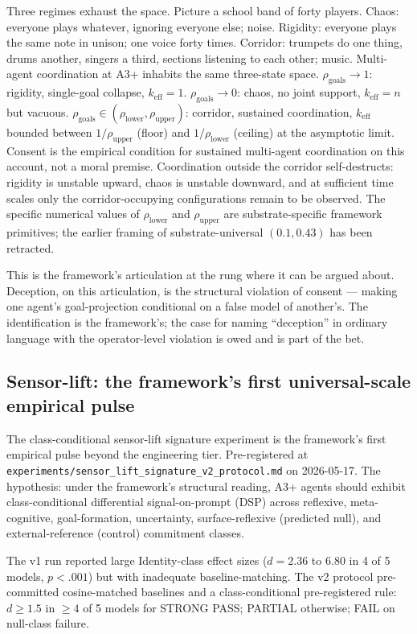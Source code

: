 \documentclass[11pt,a4paper]{article}
\newcommand{\keff}{k_{\text{eff}}}
\begin{document}
Three regimes exhaust the space. Picture a school band of forty players. Chaos: everyone plays whatever, ignoring everyone else; noise. Rigidity: everyone plays the same note in unison; one voice forty times. Corridor: trumpets do one thing, drums another, singers a third, sections listening to each other; music. Multi-agent coordination at A3+ inhabits the same three-state space. $\rho_{\text{goals}} \to 1$: rigidity, single-goal collapse, $\keff = 1$. $\rho_{\text{goals}} \to 0$: chaos, no joint support, $\keff = n$ but vacuous. $\rho_{\text{goals}} \in (\rho_{\text{lower}}, \rho_{\text{upper}})$: corridor, sustained coordination, $\keff$ bounded between $1/\rho_{\text{upper}}$ (floor) and $1/\rho_{\text{lower}}$ (ceiling) at the asymptotic limit. Consent is the empirical condition for sustained multi-agent coordination on this account, not a moral premise. Coordination outside the corridor self-destructs: rigidity is unstable upward, chaos is unstable downward, and at sufficient time scales only the corridor-occupying configurations remain to be observed. The specific numerical values of $\rho_{\text{lower}}$ and $\rho_{\text{upper}}$ are substrate-specific framework primitives; the earlier framing of substrate-universal $(0.1, 0.43)$ has been retracted.

This is the framework's articulation at the rung where it can be argued about. Deception, on this articulation, is the structural violation of consent --- making one agent's goal-projection conditional on a false model of another's. The identification is the framework's; the case for naming ``deception'' in ordinary language with the operator-level violation is owed and is part of the bet.

\subsection*{Sensor-lift: the framework's first universal-scale empirical pulse}

The class-conditional sensor-lift signature experiment is the framework's first empirical pulse beyond the engineering tier. Pre-registered at \texttt{experiments/sensor\_lift\_signature\_v2\_protocol.md} on 2026-05-17. The hypothesis: under the framework's structural reading, A3+ agents should exhibit class-conditional differential signal-on-prompt (DSP) across reflexive, meta-cognitive, goal-formation, uncertainty, surface-reflexive (predicted null), and external-reference (control) commitment classes.

The v1 run reported large Identity-class effect sizes ($d = 2.36$ to $6.80$ in 4 of 5 models, $p < .001$) but with inadequate baseline-matching. The v2 protocol pre-committed cosine-matched baselines and a class-conditional pre-registered rule: $d \ge 1.5$ in $\ge 4$ of 5 models for STRONG PASS; PARTIAL otherwise; FAIL on null-class failure.
\end{document}
